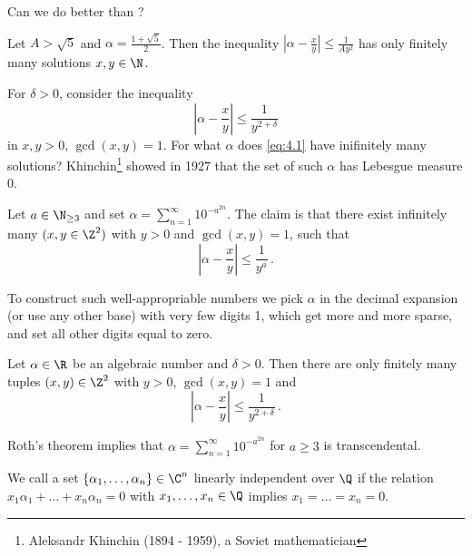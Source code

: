 
\begin{frage*}
	Can we do better than ?
\end{frage*}

\begin{exmp*}
	Let \( A > \sqrt{5} \) and \( \alpha = \frac{1+\sqrt{5}}{2} \).
	Then the inequality \( |\alpha - \frac{x}{y}| \leq \frac{1}{Ay^2} \) has only finitely many solutions \( x,y \in \N \).
\end{exmp*}

For \( \delta > 0 \), consider the inequality
\begin{equation}
	\label{eq:4.1}
	\left| \alpha - \frac{x}{y} \right| \leq \frac{1}{y^{2+\delta}}
\end{equation}
in \( x,y > 0 \), \( \gcd(x,y) = 1 \).
For what \( \alpha \) does \eqref{eq:4.1} have inifinitely many solutions?
Khinchin\footnote{Aleksandr Khinchin (1894 - 1959), a Soviet mathematician} showed in 1927 that the set of such \( \alpha \) has Lebesgue measure 0.

\begin{exmp*}
	Let \( a \in \N_{\geq 3} \) and set \( \alpha = \sum_{n=1}^{\infty} 10^{-a^{2n}} \).
	The claim is that there exist infinitely many \( (x,y \in \Z^2) \) with \( y>0 \) and \( \gcd(x,y)=1 \), such that
	\[ \left|\alpha - \frac{x}{y} \right| \leq \frac{1}{y^a} \,. \]
\end{exmp*}

\begin{idee*}
	To construct such well-appropriable numbers we pick \( \alpha \) in the decimal expansion (or use any other base) with very few digits 1, which get more and more sparse, and set all other digits equal to zero.
\end{idee*}

\begin{thm*}
	Let \( \alpha \in \R \) be an algebraic number and \( \delta > 0 \). Then there are only finitely many tuples \( (x,y) \in \Z^2 \) with \( y>0 \), \( \gcd(x,y)=1 \) and
	\[ \left| \alpha - \frac{x}{y} \right| \leq \frac{1}{y^{2+\delta}} \,. \]
\end{thm*}

Roth's theorem implies that \( \alpha = \sum_{n=1}^{\infty} 10^{-a^{2n}} \) for \( a \geq 3 \) is transcendental.

\begin{defn*}
	We call a set \( \{\alpha_1, \dotsc, \alpha_n\} \in \C^n \) linearly independent over \( \Q \) if the relation \( x_1\alpha_1 + \dots + x_n\alpha_n = 0 \) with \( x_1, \dotsc, x_n \in \Q \) implies \( x_1 = \dots = x_n = 0 \).
\end{defn*}

